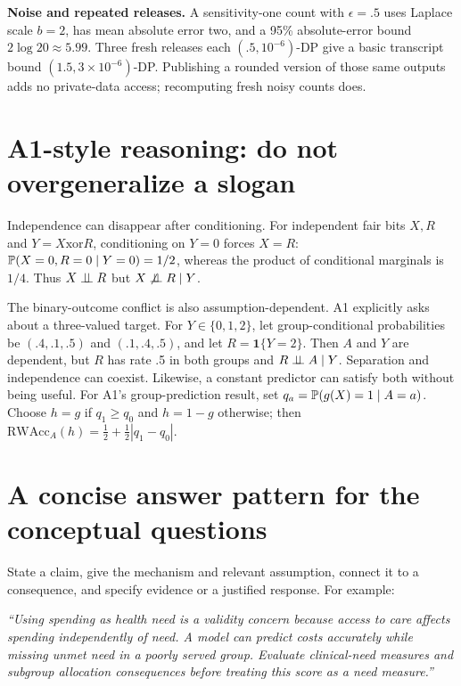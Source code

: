\documentclass[11pt,letterpaper]{article}
\begin{document}
\textbf{Noise and repeated releases.} A sensitivity-one count with
$\epsilon=.5$ uses Laplace scale $b=2$, has mean absolute error two, and
a 95\% absolute-error bound $2\log20\approx5.99$.
Three fresh releases each $(.5,10^{-6})$-DP give a basic transcript bound
$(1.5,3\!\times\!10^{-6})$-DP. Publishing a rounded version of those same
outputs adds no private-data access; recomputing fresh noisy counts does.

\section*{A1-style reasoning: do not overgeneralize a slogan}
Independence can disappear after conditioning. For independent fair bits $X,R$
and $Y=X\mathbin{\mathrm{xor}}R$, conditioning on $Y=0$ forces $X=R$:
$\mathbb{P}(X=0,R=0\mid Y=0)=1/2$, whereas the product of conditional marginals
is $1/4$. Thus $X\mathrel{\perp\!\!\!\perp} R$ but $X\not\mathrel{\perp\!\!\!\perp} R\mid Y$.

The binary-outcome conflict is also assumption-dependent. A1 explicitly asks
about a three-valued target. For $Y\in\{0,1,2\}$, let group-conditional
probabilities be $(.4,.1,.5)$ and $(.1,.4,.5)$, and let
$R=\mathbf1\{Y=2\}$. Then $A$ and $Y$ are dependent, but $R$ has rate .5
in both groups and $R\mathrel{\perp\!\!\!\perp} A\mid Y$. Separation and independence can coexist.
Likewise, a constant predictor can satisfy both without being useful.
For A1's group-prediction result, set $q_a=\mathbb{P}(g(X)=1\mid A=a)$.
Choose $h=g$ if $q_1\ge q_0$ and $h=1-g$ otherwise; then
$\mathrm{RWAcc}_A(h)=\tfrac12+\tfrac12|q_1-q_0|$.

\section*{A concise answer pattern for the conceptual questions}
State a claim, give the mechanism and relevant assumption, connect it to a
consequence, and specify evidence or a justified response. For example:

\emph{``Using spending as health need is a validity concern because access to
care affects spending independently of need. A model can predict costs accurately
while missing unmet need in a poorly served group. Evaluate clinical-need measures
and subgroup allocation consequences before treating this score as a need measure.''}
\end{document}
